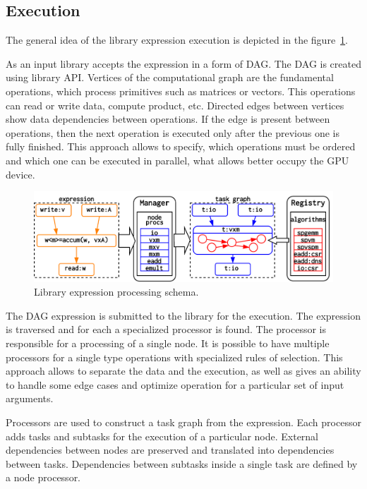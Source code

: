 \subsection{Execution}

The general idea of the library expression execution is depicted in the figure~\ref{fig:execution_schema}.

As an input library accepts the expression in a form of DAG. The DAG is created using library API. Vertices of the computational graph are the fundamental operations, which process primitives such as matrices or vectors. This operations can read or write data, compute product, etc. Directed edges between vertices show data dependencies between operations. If the edge is present between operations, then the next operation is executed only after the previous one is fully finished. This approach allows to specify, which operations must be ordered and which one can be executed in parallel, what allows better occupy the GPU device.

\begin{figure}[ht]
    \centering
    \includegraphics[width=1.0\textwidth]{images/execution_schema.png}
    \caption{Library expression processing schema.}
    \label{fig:execution_schema}
\end{figure}

The DAG expression is submitted to the library for the execution. The expression is traversed and for each a specialized processor is found. The processor is responsible for a processing of a single node. It is possible to have multiple processors for a single type operations with specialized rules of selection. This approach allows to separate the data and the execution, as well as gives an ability to handle some edge cases and optimize operation for a particular set of input arguments.

Processors are used to construct a task graph from the expression. Each processor adds tasks and subtasks for the execution of a particular node. External dependencies between nodes are preserved and translated into dependencies between tasks. Dependencies between subtasks inside a single task are defined by a node processor. 

